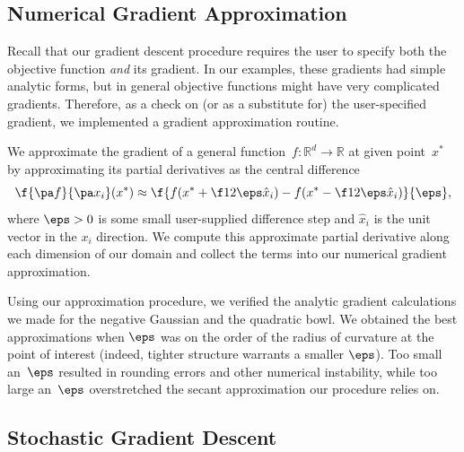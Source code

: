 \documentclass{article}
\begin{document}
\begin{multicols}{2}
\subsection{Numerical Gradient Approximation}
\label{subsec:grad-approx}

Recall that our gradient descent procedure requires the user to specify both the objective function \emph{and} its gradient. In our examples, these gradients had simple analytic forms, but in general objective functions might have very complicated gradients. Therefore, as a check on (or as a substitute for) the user-specified gradient, we implemented a gradient approximation routine.

We approximate the gradient of a general function~$f:\mathbb{R}^d\to\mathbb{R}$ at given point~$x^*$ by approximating its partial derivatives as the central difference
\begin{equation}
\label{eq:grad-approx}
\f{\pa f}{\pa x_i}(x^*) \approx \f{f(x^* + \f12\eps\hat x_i) - f(x^* - \f12 \eps\hat x_i)}{\eps},
\end{equation}
where $\eps > 0$ is some small user-supplied difference step and $\hat x_i$ is the unit vector in the $x_i$ direction. We compute this approximate partial derivative along each dimension of our domain and collect the terms into our numerical gradient approximation. 

Using our approximation procedure, we verified the analytic gradient calculations we made for the negative Gaussian and the quadratic bowl.
We obtained the best approximations when $\eps$ was on the order of the radius of curvature at the point of interest (indeed, tighter structure warrants a smaller $\eps$).
Too small an~$\eps$ resulted in rounding errors and other numerical instability, while too large an~$\eps$ overstretched the secant approximation our procedure relies on.



\subsection{Stochastic Gradient Descent}


\end{multicols}
\end{document}
